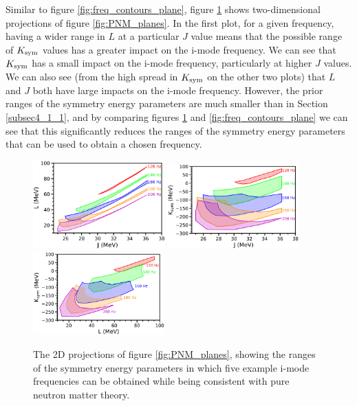 \documentclass[fleqn,usenatbib]{mnras}
\begin{document}
Similar to figure \ref{fig:freq_contours_plane}, figure \ref{fig:PNM_2d} shows two-dimensional projections of figure \ref{fig:PNM_planes}. In the first plot, for a given frequency, having a wider range in $L$ at a particular $J$ value means that the possible range of $K_{\rm sym}$ values has a greater impact on the i-mode frequency. We can see that $K_{\rm sym}$ has a small impact on the i-mode frequency, particularly at higher $J$ values. We can also see (from the high spread in $K_{\rm sym}$ on the other two plots) that $L$ and $J$ both have large impacts on the i-mode frequency. However, the prior ranges of the symmetry energy parameters are much smaller than in Section \ref{subsec4_1_1}, and by comparing figures \ref{fig:PNM_2d} and \ref{fig:freq_contours_plane} we can see that this significantly reduces the ranges of the symmetry energy parameters that can be used to obtain a chosen frequency.

\begin{figure}
\centering
\includegraphics[width=0.45\textwidth,angle=0]{PNM_JL}
\includegraphics[width=0.45\textwidth,angle=0]{PNM_JK}
\includegraphics[width=0.45\textwidth,angle=0]{PNM_LK}
\caption{The 2D projections of figure \ref{fig:PNM_planes}, showing the ranges of the symmetry energy parameters in which five example i-mode frequencies can be obtained while being consistent with pure neutron matter theory.}
\label{fig:PNM_2d}
\end{figure}
\end{document}
